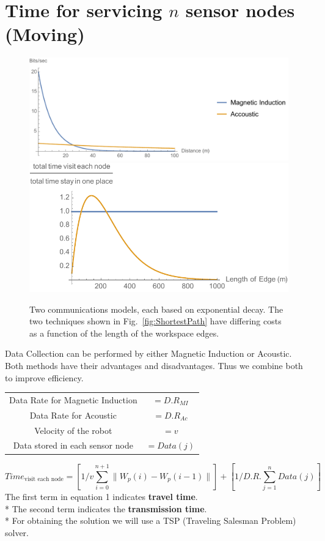 \documentclass{article}
\begin{document}
\section{Time for servicing $n$ sensor nodes (Moving)}
\begin{figure}[htb]
\begin{center}
	\includegraphics[width=0.48\columnwidth]{CommModel}
	\includegraphics[width=0.48\columnwidth]{CompareVisitEachToComm}
\end{center}
\caption{Two communications models, each based on exponential decay. The two techniques shown in Fig.\ \ref{fig:ShortestPath} have differing costs as a function of the length of the workspace edges.
\label{fig:CommModel}}
\end{figure}
 Data Collection can be performed by either Magnetic Induction or Acoustic. Both methods have their advantages and disadvantages. Thus we combine both to improve efficiency.
\\
\begin{center}
\begin{tabular}{ c c }
 Data Rate for Magnetic Induction & $= D.R_{MI}$ \\ 
 Data Rate for Acoustic  & $= D.R_{Ac}$ \\  
 Velocity of the robot & $= v$  \\ 
 Data stored in each sensor node   & $= Data(j)$\\
\end{tabular}
\end{center}

\begin{equation}
    \label{TimeEqn_Moving}
   Time_{\textrm{visit each node}}  = [1/v \sum_{i=0}^{n+1} \|W_{p}(i)-W_{p}(i-1)\|] + [1/D.R. \sum_{j=1}^{n} Data(j)]    
\end{equation}
The first term in equation 1 indicates\textbf{ travel time}.\\*
The second term indicates the \textbf{transmission time}.\\*
For obtaining the solution we will use a TSP (Traveling Salesman Problem) solver.
\end{document}
